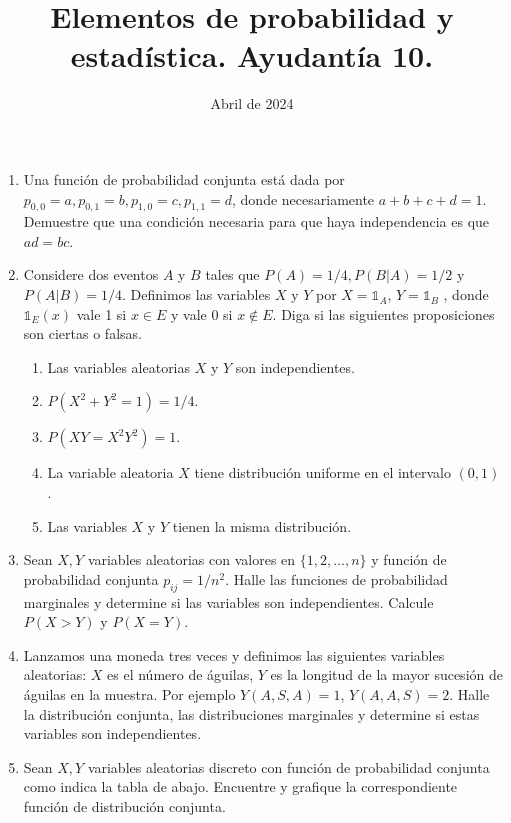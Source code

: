\documentclass{article}
\title{Elementos de probabilidad y estadística. Ayudantía 10.}
\date{Abril de 2024}
\begin{document}
\maketitle 

\begin{enumerate}

    \item Una función de probabilidad conjunta está dada por $p_{0,0} = a, p_{0,1} = b, p_{1,0} = c, p_{1,1} = d$, donde necesariamente $a + b + c + d = 1$. Demuestre que una condición necesaria para que haya independencia es que $ad = bc$.
    
    \item Considere dos eventos $A$ y $B$ tales que $P (A) = 1/4, P (B|A) = 1/2$ y $P (A|B) = 1/4$. Definimos las variables $X$
    y $Y$ por $X = \mathds 1_A$, $Y = \mathds1_B$ , donde $\mathds1_E (x)$ vale 1 si $x \in E$ y vale 0 si $x \notin E$. Diga si las siguientes proposiciones son ciertas o falsas.

    \begin{enumerate}
        \item  Las variables aleatorias $X$ y $Y$ son independientes.
        \item $P (X^2 + Y^2 = 1) = 1/4$.
        \item $P (XY = X^2Y^2) = 1$.
        \item La variable aleatoria $X$ tiene distribución uniforme en el intervalo $(0, 1)$.
        \item Las variables $X$ y $Y$ tienen la misma distribución.
    \end{enumerate}


    \item Sean $X, Y$ variables aleatorias con valores en $\{1, 2, \dots , n\}$ y función de probabilidad conjunta $p_{ij} = 1/n^2$. Halle     las funciones de probabilidad marginales y determine si las variables son independientes. Calcule $P (X > Y )$ y    $P (X = Y )$.
    
    \item Lanzamos una moneda tres veces y definimos las siguientes variables aleatorias: $X$ es el número de águilas, $Y$ es    la longitud de la mayor sucesión de águilas en la muestra. Por ejemplo $Y (A, S, A) = 1$, $Y (A, A, S) = 2$. Halle la distribución conjunta, las distribuciones marginales y determine si estas variables son independientes.
    
    \item Sean $X,Y$ variables aleatorias discreto con función de probabilidad conjunta como indica la tabla de abajo. Encuentre y grafique la correspondiente
    función de distribución conjunta.


\end{enumerate}
\end{document}
